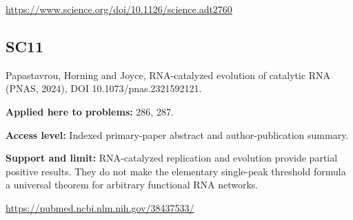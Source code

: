 \documentclass[11pt]{article}
\begin{document}
\url{https://www.science.org/doi/10.1126/science.adt2760}

\subsection*{SC11}\label{check:SC11}

Papastavrou, Horning and Joyce, RNA-catalyzed evolution of catalytic RNA (PNAS, 2024), DOI 10.1073/pnas.2321592121.

\textbf{Applied here to problems:} 286, 287.

\textbf{Access level:} Indexed primary-paper abstract and author-publication summary.

\textbf{Support and limit:} RNA-catalyzed replication and evolution provide partial positive results. They do not make the elementary single-peak threshold formula a universal theorem for arbitrary functional RNA networks.

\url{https://pubmed.ncbi.nlm.nih.gov/38437533/}
\end{document}
